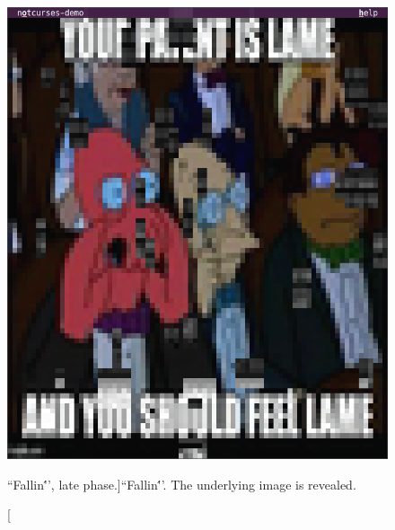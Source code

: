 \documentclass[letterpaper,10pt]{article}
\begin{document}
\begin{figure}
\begin{minipage}{0.45\textwidth}
    \includegraphics[width=1\linewidth]{media/demo-fallin2.png}
    \caption[``Fallin\''', late phase.]{``Fallin\'''. The underlying image is revealed.}
  \end{minipage}\hfill
\end{figure}
\end{document}
